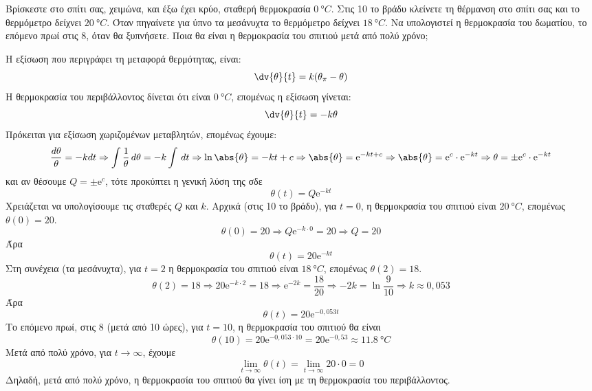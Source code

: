 \begin{myboxs1}
  \begin{problem}
    Βρίσκεστε στο σπίτι σας, χειμώνα, και έξω έχει κρύο, σταθερή θερμοκρασία 
    $ \SI{0}{\degree C} $. Στις 10 το βράδυ κλείνετε τη θέρμανση στο σπίτι σας 
    και το θερμόμετρο δείχνει $ \SI{20}{\degree C} $. Όταν πηγαίνετε για ύπνο 
    τα μεσάνυχτα το θερμόμετρο δείχνει $ \SI{18}{\degree C} $. Να υπολογιστεί η
    θερμοκρασία του δωματίου, το επόμενο πρωί στις 8, όταν θα ξυπνήσετε. Ποια θα είναι 
    η θερμοκρασία του σπιτιού μετά από πολύ χρόνο;
  \end{problem}
\end{myboxs1}
\begin{solution}
  Η εξίσωση που περιγράφει τη μεταφορά θερμότητας, είναι:
  \[
    \dv{\theta}{t} = k (\theta _{\pi} - \theta)
  \] 
  Η θερμοκρασία του περιβάλλοντος δίνεται ότι είναι 
  $ \SI{0}{\degree C} $, επομένως η εξίσωση γίνεται: 
  \[
    \dv{\theta}{t} = - k \theta  
  \] 
  Πρόκειται για εξίσωση χωριζομένων μεταβλητών, επομένως έχουμε:
  \[
    \frac{d \theta}{\theta} = - k dt \Rightarrow \int \frac{1}{\theta} \,{d \theta } 
    = -k \int  \,{dt} \Rightarrow \ln{\abs{\theta}} = - kt + c \Rightarrow \abs{\theta} 
    = \mathrm{e}^{-kt+c} \Rightarrow \abs{\theta} = \mathrm{e}^{c} \cdot \mathrm{e}^{-kt}
    \Rightarrow \theta = \pm \mathrm{e}^{c} \cdot \mathrm{e}^{-kt} 
  \] 
  και αν θέσουμε $ Q = \pm \mathrm{e}^{c} $, τότε προκύπτει η γενική λύση της σδε
  \[
    \theta(t) = Q \mathrm{e}^{-kt} 
  \]
  Χρειάζεται να υπολογίσουμε τις σταθερές $ Q $ και $ k $. 
  Αρχικά (στις 10 το βράδυ), για $ t=0 $, η θερμοκρασία του σπιτιού είναι 
  $ \SI{20}{\degree C} $, επομένως $ \theta (0) = 20 $. 
  \[
    \theta (0) = 20 \Rightarrow Q \mathrm{e}^{-k\cdot 0} = 20 \Rightarrow Q = 20
  \] 
  Άρα 
  \[
    \theta (t) = 20 \mathrm{e}^{-kt} 
  \] 
  Στη συνέχεια (τα μεσάνυχτα), για $ t=2 $ η θερμοκρασία του σπιτιού είναι $
  \SI{18}{\degree C} $, επομένως $ \theta (2) = 18 $.
  \[
    \theta (2) = 18 \Rightarrow 20 \mathrm{e}^{-k\cdot 2} = 18 \Rightarrow
    \mathrm{e}^{-2k} = \frac{18}{20} \Rightarrow -2k = \ln{\frac{9}{10}} \Rightarrow 
    k \approx 0,053
  \] 
  Άρα 
  \[
    \theta (t) = 20 \mathrm{e}^{-0,053 t} 
  \] 
  Το επόμενο πρωί, στις 8 (μετά από 10 ώρες), για $ t=10 $, η θερμοκρασία του σπιτιού 
  θα είναι 
  \[
    \theta (10) = 20 \mathrm{e}^{-0,053\cdot 10} = 20 \mathrm{e}^{-0,53} \approx 
    \SI{11,8}{\degree C}
  \] 
  Μετά από πολύ χρόνο, για $ t \to \infty $, έχουμε 
  \[
    \lim_{t \to \infty} \theta (t) = \lim_{t \to \infty} 20 \cdot 0 = 0
  \] 
  Δηλαδή, μετά από πολύ χρόνο, η θερμοκρασία του σπιτιού θα γίνει ίση με τη 
  θερμοκρασία του περιβάλλοντος.
\end{solution}

